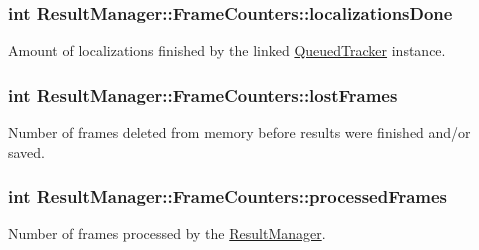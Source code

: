 \subsubsection[{\texorpdfstring{localizations\+Done}{localizationsDone}}]{\setlength{\rightskip}{0pt plus 5cm}int Result\+Manager\+::\+Frame\+Counters\+::localizations\+Done}\hypertarget{struct_result_manager_1_1_frame_counters_a9ab895a45863f01089a4fa47629e3998}{}\label{struct_result_manager_1_1_frame_counters_a9ab895a45863f01089a4fa47629e3998}


Amount of localizations finished by the linked \hyperlink{class_queued_tracker}{Queued\+Tracker} instance. 

\subsubsection[{\texorpdfstring{lost\+Frames}{lostFrames}}]{\setlength{\rightskip}{0pt plus 5cm}int Result\+Manager\+::\+Frame\+Counters\+::lost\+Frames}\hypertarget{struct_result_manager_1_1_frame_counters_a843774dd839c1edc8c0245b830b9f469}{}\label{struct_result_manager_1_1_frame_counters_a843774dd839c1edc8c0245b830b9f469}


Number of frames deleted from memory before results were finished and/or saved. 

\subsubsection[{\texorpdfstring{processed\+Frames}{processedFrames}}]{\setlength{\rightskip}{0pt plus 5cm}int Result\+Manager\+::\+Frame\+Counters\+::processed\+Frames}\hypertarget{struct_result_manager_1_1_frame_counters_a9170beb3735c4d08f00050377eeebef5}{}\label{struct_result_manager_1_1_frame_counters_a9170beb3735c4d08f00050377eeebef5}


Number of frames processed by the \hyperlink{class_result_manager}{Result\+Manager}. 

